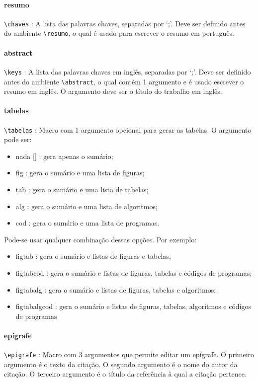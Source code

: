 \paragraph{resumo\\}
\verb|\chaves| : A lista das palavras chaves, separadas por `;'. Deve ser definido antes do ambiente \verb|\resumo|, o qual é usado para escrever o resumo em português.

\paragraph{abstract\\}
\verb|\keys| : A lista das palavras chaves em inglês, separadas por `;'. Deve ser definido antes do ambiente \verb|\abstract|, o qual contém 1 argumento e é usado escrever o resumo em inglês. O argumento deve ser o título do trabalho em inglês.

\paragraph{tabelas\\}
\verb|\tabelas| : Macro com 1 argumento opcional para gerar as tabelas. O argumento pode ser:
\begin{itemize}
 \item nada [] : gera apenas o sumário;
 \item \textsf{fig} : gera o sumário e uma lista de figuras;
 \item \textsf{tab} : gera o sumário e uma lista de tabelas;
 \item \textsf{alg} : gera o sumário e uma lista de algoritmos;
 \item \textsf{cod} : gera o sumário e uma lista de programas.
\end{itemize}

Pode-se usar qualquer combinação dessas opções. Por exemplo:
\begin{itemize}
 \item \textsf{figtab} : gera o sumário e listas de figuras e tabelas,
 \item \textsf{figtabcod} : gera o sumário e listas de figuras, tabelas e códigos de programas;
 \item \textsf{figtabalg} : gera o sumário e listas de figuras, tabelas e algoritmos;
 \item \textsf{figtabalgcod} : gera o sumário e listas de figuras, tabelas, algoritmos e códigos de programas
\end{itemize}

\paragraph{epígrafe\\}
\verb|\epigrafe| : Macro com 3 argumentos que permite editar um epígrafe. O primeiro argumento é o texto da citação. O segundo argumento é o nome do autor da citação. O terceiro argumento é o título da referência à qual a citação pertence.